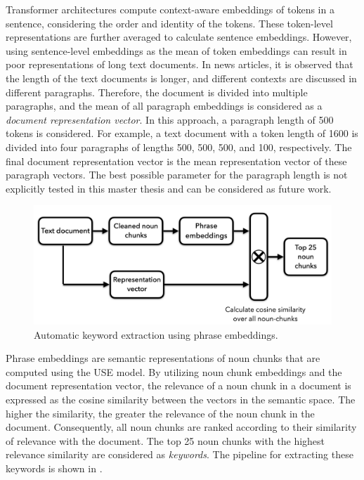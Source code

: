 Transformer architectures compute context-aware embeddings of tokens in a sentence, considering the order and identity of the tokens. These token-level representations are further averaged to calculate sentence embeddings. However, using sentence-level embeddings as the mean of token embeddings can result in poor representations of long text documents. In news articles, it is observed that the length of the text documents is longer, and different contexts are discussed in different paragraphs. Therefore, the document is divided into multiple paragraphs, and the mean of all paragraph embeddings is considered as a \emph{document representation vector}. In this approach, a paragraph length of 500 tokens is considered. For example, a text document with a token length of 1600 is divided into four paragraphs of lengths 500, 500, 500, and 100, respectively. The final document representation vector is the mean representation vector of these paragraph vectors. The best possible parameter for the paragraph length is not explicitly tested in this master thesis and can be considered as future work.



\begin{figure}[h]
	\centering
	\includegraphics[width=.9\textwidth]{images/thesis_images/keyword_extraction.png}
	\caption[Contextualized automatic keyword extraction.]{Automatic keyword extraction using phrase embeddings. \label{fig:keyword_extraction}}
\end{figure}


Phrase embeddings are semantic representations of noun chunks that are computed using the \ac{USE} model. By utilizing noun chunk embeddings and the document representation vector, the relevance of a noun chunk in a document is expressed as the cosine similarity between the vectors in the semantic space. The higher the similarity, the greater the relevance of the noun chunk in the document. Consequently, all noun chunks are ranked according to their similarity of relevance with the document. The top 25 noun chunks with the highest relevance similarity are considered as \emph{keywords}. The pipeline for extracting these keywords is shown in .


